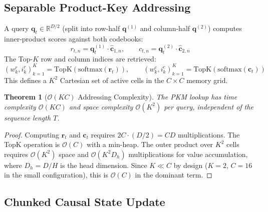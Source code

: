 \documentclass[11pt]{article}
\newtheorem{theorem}{Theorem}[section]
\begin{document}
\subsection{Separable Product-Key Addressing}

A query $\mathbf{q}_t \in \mathbb{R}^{D/2}$ (split into row-half $\mathbf{q}^{(1)}$ and column-half $\mathbf{q}^{(2)}$) computes inner-product scores against both codebooks:
\begin{equation}
    r_{t,n} = \mathbf{q}^{(1)}_t \cdot \hat{\mathbf{c}}_{1,n}, \qquad c_{t,n} = \mathbf{q}^{(2)}_t \cdot \hat{\mathbf{c}}_{2,n}
\end{equation}
The Top-$K$ row and column indices are retrieved:
\begin{equation}
    (w^r_k, i^r_k)_{k=1}^K = \mathrm{TopK}(\mathrm{softmax}(\mathbf{r}_t)), \qquad (w^c_k, i^c_k)_{k=1}^K = \mathrm{TopK}(\mathrm{softmax}(\mathbf{c}_t))
\end{equation}
This defines a $K^2$ Cartesian set of active cells in the $C \times C$ memory grid.

\begin{theorem}[$\mathcal{O}(KC)$ Addressing Complexity]
The PKM lookup has time complexity $\mathcal{O}(KC)$ and space complexity $\mathcal{O}(K^2)$ per query, independent of the sequence length $T$.
\end{theorem}
\begin{proof}
Computing $\mathbf{r}_t$ and $\mathbf{c}_t$ requires $2C \cdot (D/2) = CD$ multiplications. The TopK operation is $\mathcal{O}(C)$ with a min-heap. The outer product over $K^2$ cells requires $\mathcal{O}(K^2)$ space and $\mathcal{O}(K^2 D_h)$ multiplications for value accumulation, where $D_h = D/H$ is the head dimension. Since $K \ll C$ by design ($K = 2$, $C = 16$ in the small configuration), this is $\mathcal{O}(C)$ in the dominant term.
\end{proof}

\subsection{Chunked Causal State Update}
\end{document}
